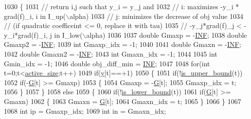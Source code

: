 \begin{DoxyCode}
1030 \{
1031     \textcolor{comment}{// return i,j such that y\_i = y\_j and}
1032     \textcolor{comment}{// i: maximizes -y\_i * grad(f)\_i, i in I\_up(\(\backslash\)alpha)}
1033     \textcolor{comment}{// j: minimizes the decrease of obj value}
1034     \textcolor{comment}{//    (if quadratic coefficeint <= 0, replace it with tau)}
1035     \textcolor{comment}{//    -y\_j*grad(f)\_j < -y\_i*grad(f)\_i, j in I\_low(\(\backslash\)alpha)}
1036 
1037     \textcolor{keywordtype}{double} Gmaxp = -\hyperlink{svm_8cpp_a12c2040f25d8e3a7b9e1c2024c618cb6}{INF};
1038     \textcolor{keywordtype}{double} Gmaxp2 = -\hyperlink{svm_8cpp_a12c2040f25d8e3a7b9e1c2024c618cb6}{INF};
1039     \textcolor{keywordtype}{int} Gmaxp\_idx = -1;
1040 
1041     \textcolor{keywordtype}{double} Gmaxn = -\hyperlink{svm_8cpp_a12c2040f25d8e3a7b9e1c2024c618cb6}{INF};
1042     \textcolor{keywordtype}{double} Gmaxn2 = -\hyperlink{svm_8cpp_a12c2040f25d8e3a7b9e1c2024c618cb6}{INF};
1043     \textcolor{keywordtype}{int} Gmaxn\_idx = -1;
1044 
1045     \textcolor{keywordtype}{int} Gmin\_idx = -1;
1046     \textcolor{keywordtype}{double} obj\_diff\_min = \hyperlink{svm_8cpp_a12c2040f25d8e3a7b9e1c2024c618cb6}{INF};
1047 
1048     \textcolor{keywordflow}{for}(\textcolor{keywordtype}{int} t=0;t<\hyperlink{class_solver_a06ba1b87b3749cc545e573151b7beca0}{active\_size};t++)
1049         \textcolor{keywordflow}{if}(\hyperlink{class_solver_a3acc1043d06dedf87f054ff3eea5c426}{y}[t]==+1)
1050         \{
1051             \textcolor{keywordflow}{if}(!\hyperlink{class_solver_a98d878b13d6f710fcaa0b16e657a37b6}{is\_upper\_bound}(t))
1052                 \textcolor{keywordflow}{if}(-\hyperlink{class_solver_ad8ab27068f2e045591970aae1201afe9}{G}[t] >= Gmaxp)
1053                 \{
1054                     Gmaxp = -\hyperlink{class_solver_ad8ab27068f2e045591970aae1201afe9}{G}[t];
1055                     Gmaxp\_idx = t;
1056                 \}
1057         \}
1058         \textcolor{keywordflow}{else}
1059         \{
1060             \textcolor{keywordflow}{if}(!\hyperlink{class_solver_a5876eedb0a6de6954f6037af0992cbed}{is\_lower\_bound}(t))
1061                 \textcolor{keywordflow}{if}(\hyperlink{class_solver_ad8ab27068f2e045591970aae1201afe9}{G}[t] >= Gmaxn)
1062                 \{
1063                     Gmaxn = \hyperlink{class_solver_ad8ab27068f2e045591970aae1201afe9}{G}[t];
1064                     Gmaxn\_idx = t;
1065                 \}
1066         \}
1067 
1068     \textcolor{keywordtype}{int} ip = Gmaxp\_idx;
1069     \textcolor{keywordtype}{int} in = Gmaxn\_idx;

\end{DoxyCode}
